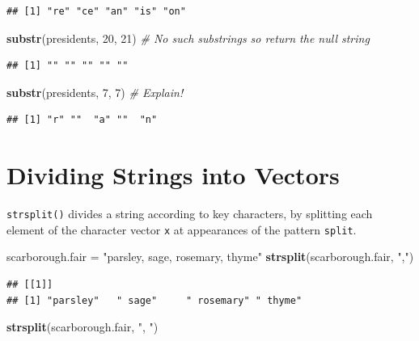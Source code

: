 \documentclass[
]{book}
\newenvironment{Shaded}{\begin{snugshade}}{\end{snugshade}}
\newcommand{\CommentTok}[1]{\textcolor[rgb]{0.56,0.35,0.01}{\textit{#1}}}
\newcommand{\DecValTok}[1]{\textcolor[rgb]{0.00,0.00,0.81}{#1}}
\newcommand{\KeywordTok}[1]{\textcolor[rgb]{0.13,0.29,0.53}{\textbf{#1}}}
\newcommand{\NormalTok}[1]{#1}
\newcommand{\StringTok}[1]{\textcolor[rgb]{0.31,0.60,0.02}{#1}}
\begin{document}
\begin{verbatim}
## [1] "re" "ce" "an" "is" "on"
\end{verbatim}

\begin{Shaded}
\begin{Highlighting}[]
\KeywordTok{substr}\NormalTok{(presidents, }\DecValTok{20}\NormalTok{, }\DecValTok{21}\NormalTok{)  }\CommentTok{# No such substrings so return the null string}
\end{Highlighting}
\end{Shaded}

\begin{verbatim}
## [1] "" "" "" "" ""
\end{verbatim}

\begin{Shaded}
\begin{Highlighting}[]
\KeywordTok{substr}\NormalTok{(presidents, }\DecValTok{7}\NormalTok{, }\DecValTok{7}\NormalTok{)  }\CommentTok{# Explain!}
\end{Highlighting}
\end{Shaded}

\begin{verbatim}
## [1] "r" ""  "a" ""  "n"
\end{verbatim}

\hypertarget{dividing-strings-into-vectors}{%
\section{Dividing Strings into Vectors}\label{dividing-strings-into-vectors}}

\texttt{strsplit()} divides a string according to key characters, by splitting each element of the character vector \texttt{x} at appearances of the pattern \texttt{split}.

\begin{Shaded}
\begin{Highlighting}[]
\NormalTok{scarborough.fair =}\StringTok{ "parsley, sage, rosemary, thyme"}
\KeywordTok{strsplit}\NormalTok{(scarborough.fair, }\StringTok{","}\NormalTok{)}
\end{Highlighting}
\end{Shaded}

\begin{verbatim}
## [[1]]
## [1] "parsley"   " sage"     " rosemary" " thyme"
\end{verbatim}

\begin{Shaded}
\begin{Highlighting}[]
\KeywordTok{strsplit}\NormalTok{(scarborough.fair, }\StringTok{", "}\NormalTok{)}
\end{Highlighting}
\end{Shaded}
\end{document}

